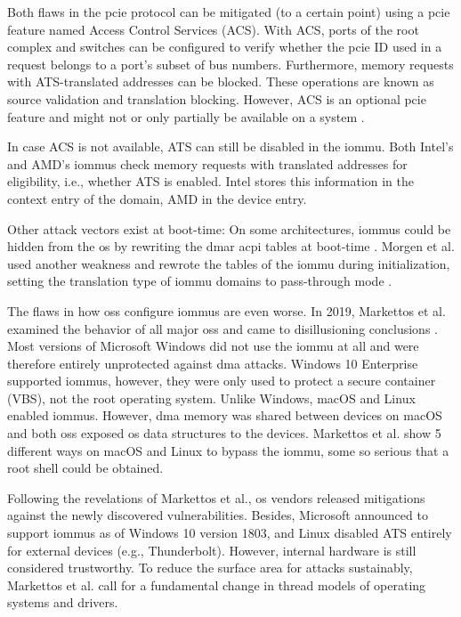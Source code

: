 Both flaws in the \ac{pcie} protocol can be mitigated (to a certain point) using
a \ac{pcie} feature named Access Control Services (ACS). With ACS, ports of the
root complex and switches can be configured to verify whether the \ac{pcie} ID
used in a request belongs to a port's subset of bus numbers. Furthermore, memory
requests with ATS-translated addresses can be blocked. These operations are
known as source validation and translation blocking. However, ACS is an optional
\ac{pcie} feature and might not or only partially be available on a system
\cite[p.~582]{pcie2017specification}.

In case ACS is not available, ATS can still be disabled in the \ac{iommu}. Both
Intel's and AMD's \acp{iommu} check memory requests with translated addresses
for eligibility, i.e., whether ATS is enabled. Intel stores this information in
the context entry of the domain, AMD in the device entry.

Other attack vectors exist at boot-time: On some architectures, \acp{iommu}
could be hidden from the \ac{os} by rewriting the \ac{dmar} \ac{acpi} tables at
boot-time \cite{wojtczuk2009another}. Morgen et al. used another weakness and
rewrote the tables of the \ac{iommu} during initialization, setting the
translation type of \ac{iommu} domains to pass-through mode
\cite{morgan2018iommu}.

The flaws in how \aclp{os} configure \acp{iommu} are even worse. In 2019,
Markettos et al. examined the behavior of all major \acp{os} and came to
disillusioning conclusions \cite{markettos2019thunderclap}. Most versions of
Microsoft Windows did not use the \ac{iommu} at all and were therefore entirely
unprotected against \ac{dma} attacks. Windows 10 Enterprise supported
\acp{iommu}, however, they were only used to protect a secure container (VBS),
not the root operating system. Unlike Windows, macOS and Linux enabled
\acp{iommu}. However, \ac{dma} memory was shared between devices on macOS and
both \aclp{os} exposed \ac{os} data structures to the devices. Markettos et al.
show 5 different ways on macOS and Linux to bypass the \ac{iommu}, some so
serious that a root shell could be obtained.

Following the revelations of Markettos et al., \ac{os} vendors released
mitigations against the newly discovered vulnerabilities. Besides, Microsoft
announced to support \acp{iommu} as of Windows 10 version 1803, and Linux
disabled ATS entirely for external devices (e.g., Thunderbolt). However,
internal hardware is still considered trustworthy. To reduce the surface area
for attacks sustainably, Markettos et al. call for a fundamental change in
thread models of operating systems and drivers.


